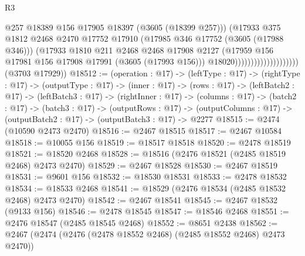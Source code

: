 \begin{lexlean}{R3}
\begin{coremodule}
                                            @257
                                            @18389
                                            @156
                                            @17905
                                            @18397
                                            (@3605 (@18399 @257)))
                                          (@17933
                                            @375
                                            @1812
                                            @2468
                                            @2470
                                            @17752
                                            @17910
                                            (@17985 @346 @17752 (@3605 (@17988 @346)))
                                            (@17933
                                              @1810
                                              @211
                                              @2468
                                              @2468
                                              @17908
                                              @2127
                                              (@17959
                                                @156
                                                @17981
                                                @156
                                                @17908
                                                @17991
                                                (@3605 (@17993 @156)))
                                              @18020))))))))))))))))))))
      (@3703 @17929))
@18512 := (operation : @17) ->
  (leftType : @17) ->
  (rightType : @17) ->
  (outputType : @17) ->
  (inner : @17) ->
  (rows : @17) ->
  (leftBatch2 : @17) ->
  (leftBatch3 : @17) ->
  (rightInner : @17) ->
  (columns : @17) ->
  (batch2 : @17) ->
  (batch3 : @17) ->
  (outputRows : @17) ->
  (outputColumns : @17) -> (outputBatch2 : @17) -> (outputBatch3 : @17) -> @2277
@18515 := @2474 (@10590 @2473 @2470)
@18516 := @2467 @18515
@18517 := @2467 @10584
@18518 := @10055 @156
@18519 := @18517 @18518
@18520 := @2478 @18519
@18521 := @18520 @2468
@18528 := @18516 (@2476 @18521 (@2485 @18519 @2468) @2473 @2470)
@18529 := @2467 @18528
@18530 := @2467 @18519
@18531 := @9601 @156
@18532 := @18530 @18531
@18533 := @2478 @18532
@18534 := @18533 @2468
@18541 := @18529 (@2476 @18534 (@2485 @18532 @2468) @2473 @2470)
@18542 := @2467 @18541
@18545 := @2467 @18532 (@9133 @156)
@18546 := @2478 @18545
@18547 := @18546 @2468
@18551 := @2476 @18547 (@2485 @18545 @2468)
@18552 := @8651 @2438
@18562 := @2467 (@2474 (@2476 (@2478 @18552 @2468) (@2485 @18552 @2468) @2473 @2470))

\end{coremodule}
\end{lexlean}
